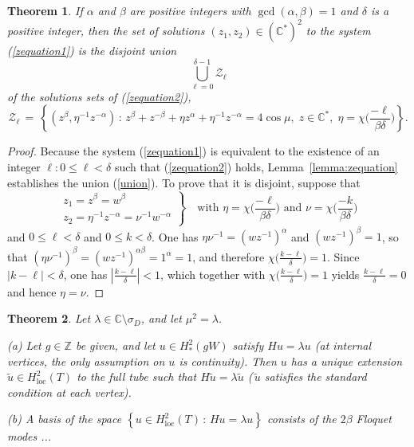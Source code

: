 \documentclass[12pt]{article}
\newtheorem{theorem}{Theorem}
\newcommand{\CC}{\mathbb{C}}
\newcommand{\ZZ}{\mathbb{Z}}
\newcommand{\cchi}[1]{{\textstyle{\chi\big(#1\big)}}}
\newcommand{\Hloc}{H^2_\text{loc}}
\begin{document}
\begin{theorem}\label{thm:zequation}
If $\alpha$ and $\beta$ are positive integers with $\gcd(\alpha,\beta)=1$ and $\delta$ is a positive integer, then
the set of solutions $(z_1,z_2)\in(\CC^*)^2$ to the system (\ref{zequation1}) is the {\em disjoint} union
%
\begin{equation}
  \bigcup\limits_{\ell=0}^{\delta-1} {\mathcal Z}_\ell
\end{equation}
%
of the solutions sets of (\ref{zequation2}),
%
\begin{equation}\label{union}
  {\mathcal Z}_\ell \,=\,
  \left\{ (z^\beta, \eta^{-1}z^{-\alpha})\,:\,
    z^\beta + z^{-\beta} + \eta z^\alpha + \eta^{-1} z^{-\alpha} = 4\cos\mu,\; z\in\CC^*,\; \eta=\cchi{\frac{-\ell}{\beta\delta}}
  \right\}.
\end{equation}
%
\end{theorem}

\begin{proof}
Because the system (\ref{zequation1}) is equivalent to the existence of an integer $\ell:0\leq\ell<\delta$ such that (\ref{zequation2}) holds, Lemma~\ref{lemma:zequation} establishes the union (\ref{union}).  To prove that it is disjoint, suppose that
%
\begin{equation}
  \renewcommand{\arraystretch}{1.1}
\left.
  \begin{array}{r}
    z_1=z^{\beta} = w^{\beta} \\
    z_2 = \eta^{-1} z^{-\alpha} = \nu^{-1} w^{-\alpha}
  \end{array}
\right\}
\quad\text{with $\eta=\cchi{\frac{-\ell}{\beta\delta}}$ and $\nu=\cchi{\frac{-k}{\beta\delta}}$}
\end{equation}
%
and $0\leq\ell<\delta$ and $0\leq k<\delta$.
One has $\eta\nu^{-1}=(wz^{-1})^\alpha$ and $(wz^{-1})^\beta=1$, so that
$(\eta\nu^{-1})^\beta = (wz^{-1})^{\alpha\beta} = 1^\alpha = 1$, and therefore $\cchi{\frac{k-\ell}{\delta}}=1$.  Since $|k-\ell|<\delta$, one has $\left| \frac{k-\ell}{\delta} \right|<1$, which together with $\cchi{\frac{k-\ell}{\delta}}=1$ yields $\frac{k-\ell}{\delta}=0$ and hence $\eta=\nu$.
\end{proof}


\begin{theorem}\label{thm:modes} Let $\lambda\in\CC\setminus\sigma_D$, and let $\mu^2=\lambda$.

(a)  Let $g\in\ZZ$ be given, and let $u\in H^2_*(gW)$ satisfy $Hu=\lambda u$ (at internal vertices, the only assumption on $u$ is continuity).  Then $u$ has a unique extension $\tilde u \in \Hloc(T)$ to the full tube such that $H\tilde u=\lambda \tilde u$ (\,$\tilde u$ satisfies the standard condition at each vertex).

(b)  A basis of the space $\left\{ u\in\Hloc(T) \,:\, Hu = \lambda u \right\}$ consists of the $2\beta$ Floquet modes ...
\end{theorem}
\end{document}
